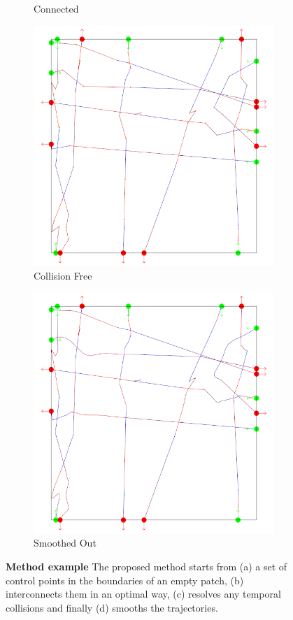 \begin{figure}[t]
\begin{subfigure}[b]{0.24\linewidth}
	 	\caption{Connected}
	 \end{subfigure}
	 \begin{subfigure}[b]{0.24\linewidth}
	 	\includegraphics[width=\linewidth]{images/steps-collisionFree.png}
	 	\caption{Collision Free}
	 \end{subfigure}
	 \begin{subfigure}[b]{0.24\linewidth}
	 	\includegraphics[width=\linewidth]{images/steps-smoothed.png}
	 	\caption{Smoothed Out}
	 \end{subfigure}
	 \caption{\textbf{Method example}
	 			The proposed method starts from
	 			(a) a set of control points in the boundaries of an empty patch,
	 			(b) interconnects them in an optimal way,
	 			(c) resolves any temporal collisions and finally
	 			(d) smooths the trajectories.
	 }
 \label{fig:res:steps}
\end{figure}
